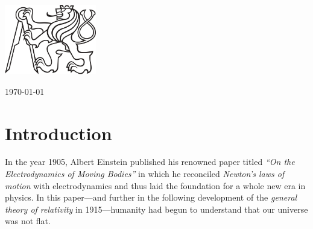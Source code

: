 \documentclass[11pt,a4paper,twoside,openany]{report}
\theoremstyle{my-theorem}
\theoremstyle{non-theorem}
\begin{document}
\begin{titlepage}
		
		\vfill\vfill\vfill	%
		\includegraphics[width=0.3\textwidth]{ctu_logo_black.jpg}
		
		
		\vfill\vfill
		{\large\monthyeardate\today}\\[1cm]
		
		
		\vfill %
		
	\end{titlepage}

	\newpage\blankpage	%
	
	
	\declarationpage	%
	
	\acknowledgementspage	%
	
	\abstractpage	%
	
	\tableofcontents	%
	
	\chapter*{Introduction}
	\label{chap:introduction}
	
	In the year 1905, Albert Einstein published his renowned paper titled \emph{``On the Electrodynamics of Moving Bodies''} in which he reconciled \emph{Newton's laws of motion} with electrodynamics and thus laid the foundation for a whole new era in physics. In this paper---and further in the following development of the \emph{general theory of relativity} in 1915---humanity had begun to understand that our universe was not flat.
	
\end{document}
